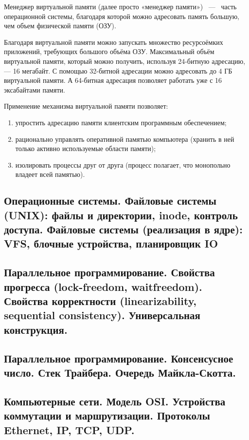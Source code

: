 \documentclass{article}
\begin{document}
Менеджер виртуальной памяти (далее просто «менеджер памяти») ~---~ часть операционной системы, благодаря которой можно адресовать память большую, чем объем физической памяти (ОЗУ).

Благодаря виртуальной памяти можно запускать множество ресурсоёмких приложений, требующих большого объёма ОЗУ. Максимальный объём виртуальной памяти, который можно получить, используя 24-битную адресацию, — 16 мегабайт. С помощью 32-битной адресации можно адресовать до 4 ГБ виртуальной памяти. А 64-битная адресация позволяет работать уже с 16 эксабайтами памяти.

Применение механизма виртуальной памяти позволяет:

\begin{enumerate}
	\item упростить адресацию памяти клиентским программным обеспечением;
	\item рационально управлять оперативной памятью компьютера (хранить в ней только активно используемые области памяти);
	\item изолировать процессы друг от друга (процесс полагает, что монопольно владеет всей памятью).
\end{enumerate}

\subsection{Операционные системы. Файловые системы (UNIX): файлы и директории, inode, контроль доступа. Файловые системы (реализация в ядре): VFS, блочные устройства, планировщик IO}

\subsection{Параллельное программирование. Свойства прогресса (lock-freedom, waitfreedom). Свойства корректности (linearizability, sequential consistency). Универсальная конструкция.}

\subsection{Параллельное программирование. Консенсусное число. Стек Трайбера. Очередь Майкла-Скотта.}

\subsection{Компьютерные сети. Модель OSI. Устройства коммутации и маршрутизации. Протоколы Ethernet, IP, TCP, UDP.}
\end{document}
